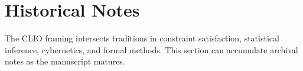 \chapter*{Historical Notes}

The CLIO framing intersects traditions in constraint satisfaction, statistical inference, cybernetics, and formal methods. This section can accumulate archival notes as the manuscript matures.
